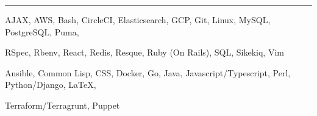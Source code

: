 \documentclass[10pt,letterpaper]{article}
\newenvironment{indentsection}[1]%
{\begin{list}{}%
  {\setlength{\leftmargin}{#1}}%
  \item[]%
}
{\end{list}}
\begin{document}
\vspace{0.1in}
\hrule
\vspace{0.2in}
\begin{indentsection}{\parindent}
\begin{description}
  \item[Languages \& Tools]
  \item AJAX, AWS, Bash, CircleCI, Elasticsearch, GCP, Git, Linux, MySQL, PostgreSQL, Puma,
  \item RSpec, Rbenv, React, Redis, Resque, Ruby (On Rails), SQL, Sikekiq, Vim
  \item[Limited Experience]
  \item Ansible, Common Lisp, CSS, Docker, Go, Java, Javascript/Typescript, Perl, Python/Django, \LaTeX,
  \item Terraform/Terragrunt, Puppet
\end{description}
\end{indentsection}
\end{document}
